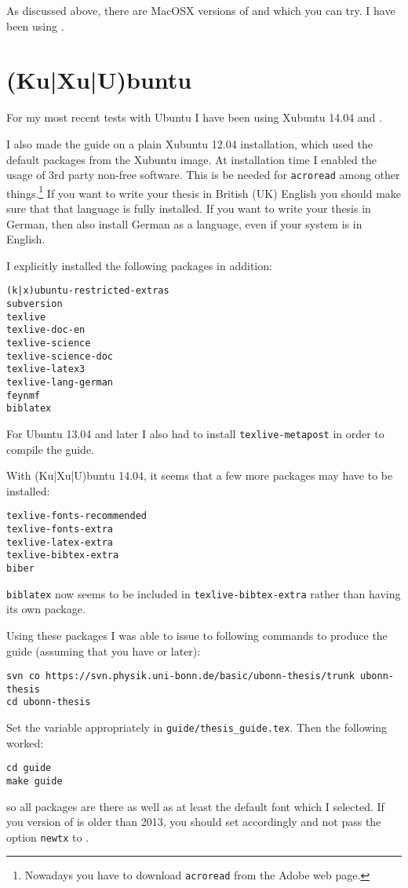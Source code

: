 As discussed above, there are MacOSX versions of \TeXstudio and \TeXmaker which you can try.
I have been using \TeXstudio.


\section{(Ku|Xu|U)buntu}
\label{sec:app:kubuntu}

For my most recent tests with Ubuntu I have been using Xubuntu 14.04 and 
.

I also made the guide on a plain Xubuntu 12.04
installation, which used the default packages from the Xubuntu image. At
installation time I enabled the usage of 3rd party non-free
software. This is be needed for \texttt{acroread} among other
things.\footnote{Nowadays you have to download \texttt{acroread} from
  the Adobe web page.} 
If you want to write your thesis in British (UK) English you should make sure
that that language is fully installed. If you want to write your
thesis in German, then also install German as a language, even if
your system is in English.

I explicitly installed the following packages in addition:
\begin{verbatim}
(k|x)ubuntu-restricted-extras
subversion
texlive
texlive-doc-en
texlive-science
texlive-science-doc
texlive-latex3
texlive-lang-german
feynmf
biblatex
\end{verbatim}
For Ubuntu 13.04 and later I also had to install \texttt{texlive-metapost} in
order to compile the guide.

With (Ku|Xu|U)buntu 14.04, it seems that a few more packages may have to be installed:
\begin{verbatim}
texlive-fonts-recommended
texlive-fonts-extra
texlive-latex-extra
texlive-bibtex-extra
biber
\end{verbatim}
\texttt{biblatex} now seems to be included in \texttt{texlive-bibtex-extra} rather than having its own package.

\noindent
Using these packages I was able to issue to following commands to
produce the guide (assuming that you have  or later):
\begin{verbatim}
svn co https://svn.physik.uni-bonn.de/basic/ubonn-thesis/trunk ubonn-thesis
cd ubonn-thesis
\end{verbatim}
Set the  variable appropriately in \texttt{guide/thesis\_guide.tex}.
Then the following worked:
\begin{verbatim}
cd guide
make guide
\end{verbatim}
so all packages are there as well as at least the default font which I
selected. If you version of \TeXLive is older than 2013, you should set
 accordingly and not pass the option \texttt{newtx} to .

